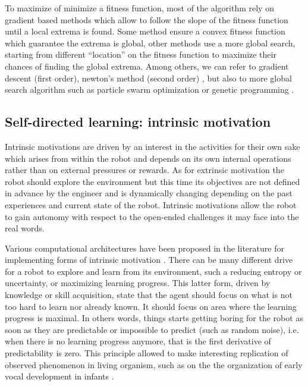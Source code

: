 To maximize of minimize a fitness function, most of the algorithm rely on gradient based methods which allow to follow the slope of the fitness function until a local extrema is found. Some method ensure a convex fitness function which guarantee the extrema is global, other methods use a more global search, starting from different ``location'' on the fitness function to maximize their chances of finding the global extrema. Among others, we can refer to gradient descent (first order), newton's method (second order) \cite{battiti1992first}, but also to more global search algorithm such as particle swarm optimization \cite{kennedy1995particle,poli2007particle} or genetic programming \cite{goldberg1989genetic,nolfi1994evolve}.

\subsection{Self-directed learning: intrinsic motivation}

Intrinsic motivations are driven by an interest in the activities for their own sake which arises from within the robot and depends on its own internal operations rather than on external pressures or rewards. As for extrinsic motivation the robot should explore the environment but this time its objectives are not defined in advance by the engineer and is dynamically changing depending on the past experiences and current state of the robot. Intrinsic motivations \cite{oudeyer2007what} allow the robot to gain autonomy with respect to the open-ended challenges it may face into the real words. 

Various computational architectures have been proposed in the literature for implementing forms of intrinsic motivation \cite{schmidhuber1991adaptive,thrun1995exploration,huang2002novelty,kaplan2003motivational,marshall2004emergent,csimcsek2006intrinsic,sporns2006evolving,capdepuy2007maximization,schembri2007evolving,merrick2009motivated,baranes2009r}. There can be many different drive for a robot to explore and learn from its environment, such a reducing entropy or uncertainty, or maximizing learning progress. This latter form, driven by knowledge or skill acquisition, state that the agent should focus on what is not too hard to learn nor already known. It should focus on area where the learning progress is maximal. In others words, things starts getting boring for the robot as soon as they are predictable or impossible to predict (such as random noise), i.e. when there is no learning progress anymore, that is the first derivative of predictability is zero. This principle allowed to make interesting replication of observed phenomenon in living organism, such as on the the organization of early vocal development in infants \cite{moulin2013self}.

